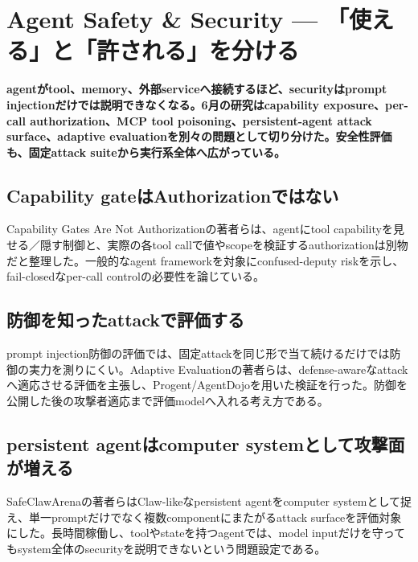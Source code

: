\section{Agent Safety \& Security — 「使える」と「許される」を分ける}
\label{pkg:agent-safety-security-june}
\noindent\textbf{agentがtool、memory、外部serviceへ接続するほど、securityはprompt injectionだけでは説明できなくなる。6月の研究はcapability exposure、per-call authorization、MCP tool poisoning、persistent-agent attack surface、adaptive evaluationを別々の問題として切り分けた。安全性評価も、固定attack suiteから実行系全体へ広がっている。}\autocite{src-02da0db00c2d,src-6da0c5a88fa4,src-91b06074799d,src-c000018ba1f0,src-cd4b60edfee7}

\subsection{Capability gateはAuthorizationではない}

Capability Gates Are Not Authorizationの著者らは、agentにtool capabilityを見せる／隠す制御と、実際の各tool callで値やscopeを検証するauthorizationは別物だと整理した。一般的なagent frameworkを対象にconfused-deputy riskを示し、fail-closedなper-call controlの必要性を論じている。\autocite{src-02da0db00c2d}


\subsection{防御を知ったattackで評価する}

prompt injection防御の評価では、固定attackを同じ形で当て続けるだけでは防御の実力を測りにくい。Adaptive Evaluationの著者らは、defense-awareなattackへ適応させる評価を主張し、Progent/AgentDojoを用いた検証を行った。防御を公開した後の攻撃者適応まで評価modelへ入れる考え方である。\autocite{src-cd4b60edfee7}


\subsection{persistent agentはcomputer systemとして攻撃面が増える}

SafeClawArenaの著者らはClaw-likeなpersistent agentをcomputer systemとして捉え、単一promptだけでなく複数componentにまたがるattack surfaceを評価対象にした。長時間稼働し、toolやstateを持つagentでは、model inputだけを守ってもsystem全体のsecurityを説明できないという問題設定である。\autocite{src-6da0c5a88fa4}


